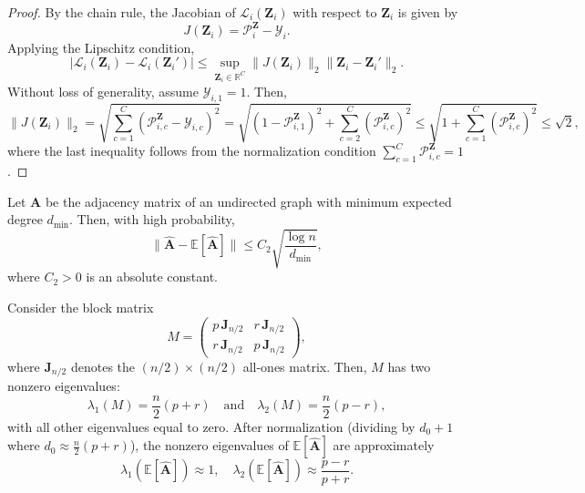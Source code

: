 \begin{proof}
    By the chain rule, the Jacobian of $\mathcal{L}_i(\mathbf{Z}_i)$ with respect to $\mathbf{Z}_i$ is given by
\begin{equation}
    J(\mathbf{Z}_i) = \mathcal{P}_i^{\mathbf{Z}} - \mathcal{Y}_i.
\end{equation}
Applying the Lipschitz condition,
\begin{equation}
    | \mathcal{L}_i(\mathbf{Z}_i) - \mathcal{L}_i(\mathbf{Z}_i') | \leq \sup_{\mathbf{Z}_i \in \mathbb{R}^{C}} \| J(\mathbf{Z}_i) \|_2 \| \mathbf{Z}_i - \mathbf{Z}_i' \|_2.
\end{equation}
Without loss of generality, assume $\mathcal{Y}_{i,1} = 1$. Then,
\begin{equation*}
    \| J(\mathbf{Z}_i) \|_2 = \sqrt{\sum_{c=1}^{C} (\mathcal{P}_{i,c}^{\mathbf{Z}} - \mathcal{Y}_{i,c})^2} = \sqrt{ (1-\mathcal{P}_{i,1}^{\mathbf{Z}})^2 + \sum_{c=2}^{C} (\mathcal{P}_{i,c}^{\mathbf{Z}})^2} \leq \sqrt{ 1 + \sum_{c=1}^{C} (\mathcal{P}_{i,c}^{\mathbf{Z}})^2} \leq \sqrt{2},
\end{equation*}
where the last inequality follows from the normalization condition $\sum_{c=1}^{C} \mathcal{P}_{i,c}^{\mathbf{Z}} = 1$.
\end{proof}
\begin{lemma}
\label{lem:feige-ofek}
Let \(\mathbf{A}\) be the adjacency matrix of an undirected graph with minimum expected degree \(d_{\min}\). Then, with high probability,
\[
\|\hat{\mathbf{A}} - \mathbb{E}[\hat{\mathbf{A}}]\| \le C_2 \sqrt{\frac{\log n}{d_{\min}}},
\]
where \(C_2 > 0\) is an absolute constant.
\end{lemma}
\begin{lemma}
\label{lem:block-spectral}
Consider the block matrix
\[
M = \begin{pmatrix}
p\,\mathbf{J}_{n/2} & r\,\mathbf{J}_{n/2} \\
r\,\mathbf{J}_{n/2} & p\,\mathbf{J}_{n/2}
\end{pmatrix},
\]
where \(\mathbf{J}_{n/2}\) denotes the \((n/2)\times(n/2)\) all-ones matrix. Then, \(M\) has two nonzero eigenvalues:
\[
\lambda_1(M) = \frac{n}{2}(p+r) \quad \text{and} \quad \lambda_2(M) = \frac{n}{2}(p-r),
\]
with all other eigenvalues equal to zero. After normalization (dividing by \(d_0+1\) where \(d_0 \approx \frac{n}{2}(p+r)\)), the nonzero eigenvalues of \(\mathbb{E}[\hat{\mathbf{A}}]\) are approximately
\[
\lambda_1(\mathbb{E}[\hat{\mathbf{A}}]) \approx 1,\quad \lambda_2(\mathbb{E}[\hat{\mathbf{A}}]) \approx \frac{p-r}{p+r}.
\]
\end{lemma}

